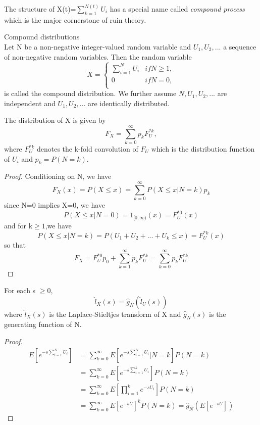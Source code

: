 \documentclass[project2.tex]{subfiles}
\begin{document}
\paragraph{}
The structure of X(t)=$\sum^{N(t)}_{k=1} U_i$ has a special name called {\it compound process} which is the major cornerstone of ruin theory.
\begin{definition}
Compound distributions \\
Let N be a non-negative integer-valued random variable and $U_1,U_2,...$ a sequence of non-negative random variables. Then the random variable
\begin{equation}
X = \left\{
\begin{array}{lcl}
\sum^{N}_{i=1} U_i  &if N\geq 1,\\
 0 &if N=0,\\
\end{array} 
\right.
\end{equation}
is called the compound distribution. We further assume $N,U_1,U_2,...$ are independent and $U_1,U_2,...$ are identically distributed.
\end{definition}
\begin{theorem}
The distribution of X is given by $$F_X=\sum_{k=0}^{\infty}p_kF^{*k}_{U},$$ where $F^{*k}_{U}$ denotes the k-fold convolution of $F_U$ which is the distribution function of $U_i$ and $p_k=P(N=k)$.
\end{theorem}
\begin{proof}
Conditioning on N, we have $$F_X(x)=P(X\leq x)=\sum^{\infty}_{k=0}P(X\leq x|N=k)p_k$$
since N=0 implies X=0, we have $$P(X\leq x|N=0)=1_{[0,\infty )}(x)=F^{*0}_{U}(x)$$ and for k$\geq 1$,we have $$P(X\leq x|N=k)=P(U_1+U_2+...+U_k\leq x)=F^{*k}_{U}(x)$$
so that $$F_X=F^{*0}_{U}p_0+\sum_{k=1}^{\infty}p_kF^{*k}_{U}=\sum_{k=0}^{\infty}p_kF^{*k}_{U}$$
\end{proof}
\begin{theorem}
For each s $\geq 0$,$$\hat{l}_X(s)=\hat{g}_N(\hat{l}_U(s))$$
where $\hat{l}_X(s)$ is the Laplace-Stieltjes transform of X and $\hat{g}_N(s)$ is the generating function of N.
\end{theorem}
\begin{proof}
\begin{align*}
E[e^{-s\sum_{i=1}^N U_i}]&=\sum_{k=0}^{\infty}E[e^{-s\sum_{i=1}^N U_i}|N=k]P(N=k)\\
&=\sum_{k=0}^{\infty}E[e^{-s\sum_{i=1}^k U_i}]P(N=k)\\
&=\sum_{k=0}^{\infty}E[\prod_{i=1}^ke^{-s U_i}]P(N=k)\\
&=\sum_{k=0}^{\infty}E[e^{-s U}]^kP(N=k)=\hat{g}_N(E[e^{-s U}])
\end{align*}
\end{proof}
\end{document}
